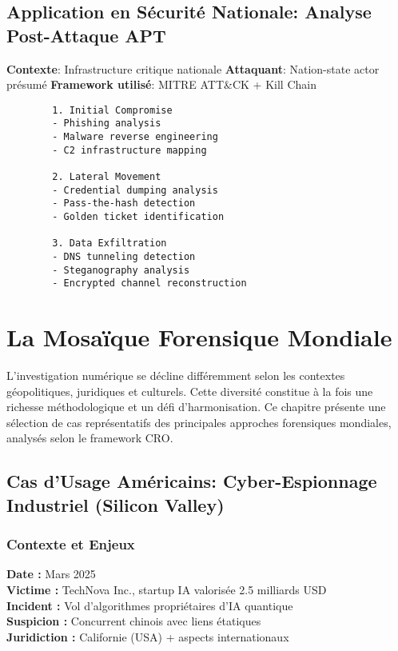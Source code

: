     \subsection{Application en Sécurité Nationale: Analyse Post-Attaque APT}
        \textbf{Contexte}: Infrastructure critique nationale
        \textbf{Attaquant}: Nation-state actor présumé
        \textbf{Framework utilisé}: MITRE ATT\&CK + Kill Chain
        \begin{verbatim}
        1. Initial Compromise
        - Phishing analysis
        - Malware reverse engineering
        - C2 infrastructure mapping

        2. Lateral Movement
        - Credential dumping analysis
        - Pass-the-hash detection
        - Golden ticket identification

        3. Data Exfiltration
        - DNS tunneling detection
        - Steganography analysis
        - Encrypted channel reconstruction
        \end{verbatim}

\section{La Mosaïque Forensique Mondiale}

L'investigation numérique se décline différemment selon les contextes géopolitiques, juridiques et culturels. Cette diversité constitue à la fois une richesse méthodologique et un défi d'harmonisation. Ce chapitre présente une sélection de cas représentatifs des principales approches forensiques mondiales, analysés selon le framework CRO.

\subsection{Cas d'Usage Américains: Cyber-Espionnage Industriel (Silicon Valley)}

\subsubsection{Contexte et Enjeux}

\textbf{Date :} Mars 2025 \\
\textbf{Victime :} TechNova Inc., startup IA valorisée 2.5 milliards USD \\
\textbf{Incident :} Vol d'algorithmes propriétaires d'IA quantique \\
\textbf{Suspicion :} Concurrent chinois avec liens étatiques \\
\textbf{Juridiction :} Californie (USA) + aspects internationaux

